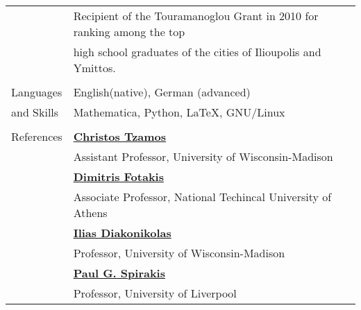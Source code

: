 \documentclass[letterpaper,11pt,oneside]{article}
\begin{document}
\begin{longtable}{@{} l l}
 & Recipient of the Touramanoglou Grant in 2010 for ranking among the top \\
 & high school graduates of the cities of Ilioupolis and Ymittos. \\
 &\\

  \Large{Languages}   & English(native), German (advanced) \\
\Large{and Skills}    & Mathematica, Python, \LaTeX, GNU/Linux\\
&\\


 \Large{References}
 & \href{http://www.tzamos.com}{\textbf{Christos Tzamos}} \\
 & Assistant Professor, University of Wisconsin-Madison \\
 & \href{http://www.fotakis.cs.ntua.gr}{\textbf{Dimitris Fotakis}} \\
 & Associate Professor, National Techincal University of Athens\\
 & \href{http://www.iliasdiakonikolas.org}{\textbf{Ilias Diakonikolas}} \\
 & Professor, University of Wisconsin-Madison \\
 & \href{http://www.professortwo.com}{\textbf{Paul G. Spirakis}} \\
 & Professor, University of Liverpool\\
\end{longtable}
\end{document}

